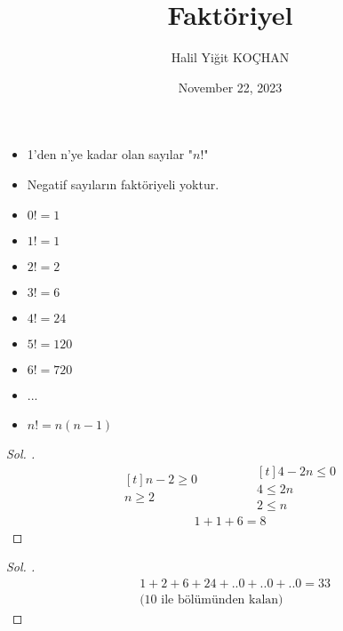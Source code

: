 \documentclass{article}
\title{Faktöriyel}
\author{Halil Yiğit KOÇHAN}
\date{November 22, 2023}
\theoremstyle{mytheoremstyle}
\theoremstyle{mytheoremstyle}
\theoremstyle{myproblemstyle}
\begin{document}
    \maketitle

\begin{itemize}
  \item 1'den n'ye kadar olan sayılar "$ n! $"
  \item Negatif sayıların faktöriyeli yoktur.
  \item $ 0! = 1 $
  \item $ 1! = 1 $
  \item $ 2! = 2 $
  \item $ 3! = 6 $
  \item $ 4! = 24 $
  \item $ 5! = 120 $
  \item $ 6! = 720 $
  \item ...
  \item $ n! = n(n - 1) $
\end{itemize}

\begin{problem}[$ (n - 2)! + 4 - 2n + 3! = ? $]
\end{problem}

\begin{proof}[\textit{ Sol. }]
  \begin{equation*}
    \begin{aligned}[t]
      n - 2 \ge 0\\
      n \ge 2
    \end{aligned}
    \qquad\qquad
    \begin{aligned}[t]
      4 - 2n \le 0\\
      4 \le 2n\\
      2 \le n
    \end{aligned}
  \end{equation*}
  \begin{align*}
    1 + 1 + 6 = 8
  \end{align*}
\end{proof}

\begin{problem}
\end{problem}

\begin{proof}[\textit{ Sol. }]
  \begin{align*}
    &1 + 2 + 6 + 24 + ..0 + ..0 + ..0 = 33\\
    &\text{(10 ile bölümünden kalan)}
  \end{align*}
\end{proof}
\end{document}
